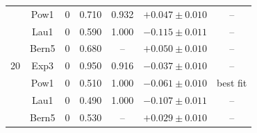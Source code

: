 \begin{table}[htbp]
\begin{center}
{\begin{tabular}{|c|c|c|c|c|c|c|}
       & Pow1 & 0 & 0.710 & 0.932 & $+0.047 \pm 0.010$ & -- \\
       & Lau1 & 0 & 0.590 & 1.000 & $-0.115 \pm 0.011$ & -- \\
       & Bern5 & 0 & 0.680 & -- & $+0.050 \pm 0.010$ & -- \\
      \hline
      20 & Exp3 & 0 & 0.950 & 0.916 & $-0.037 \pm 0.010$ & -- \\
       & Pow1 & 0 & 0.510 & 1.000 & $-0.061 \pm 0.010$ & best fit \\
       & Lau1 & 0 & 0.490 & 1.000 & $-0.107 \pm 0.011$ & -- \\
       & Bern5 & 0 & 0.530 & -- & $+0.029 \pm 0.010$ & -- \\
      \hline
    \end{tabular}
    }
  \end{center}
\end{table}
